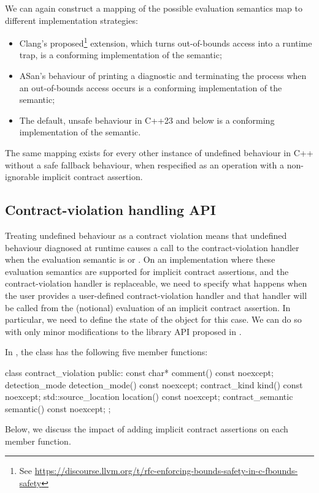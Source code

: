 We can again construct a mapping of the possible evaluation semantics map to different implementation strategies:
\begin{itemize}
\item Clang's proposed\footnote{See \url{https://discourse.llvm.org/t/rfc-enforcing-bounds-safety-in-c-fbounds-safety}}  extension, which turns out-of-bounds access into a runtime trap, is a conforming implementation of the  semantic;
\item ASan's behaviour of printing a diagnostic and terminating the process when an  out-of-bounds access occurs is a conforming implementation of the  semantic;
\item The default, unsafe behaviour in C++23 and below is a conforming implementation of the  semantic.
\end{itemize}
The same mapping exists for every other instance of undefined behaviour in C++ without a safe fallback behaviour, when respecified as an operation with a non-ignorable implicit contract assertion.

\subsection{Contract-violation handling API}

Treating undefined behaviour as a contract violation means that undefined behaviour diagnosed at runtime causes a call to the contract-violation handler when the evaluation semantic is  or . On an implementation where these evaluation semantics are supported for implicit contract assertions, and the contract-violation handler is replaceable, we need to specify what happens when the user provides a user-defined  contract-violation handler and that handler will be called from the (notional) evaluation of an implicit contract assertion. In particular, we need to define the state of the  object for this case. We can do so with only minor modifications to the library API proposed in \cite{P2900R6}. 

In \cite{P2900R6}, the  class has the following five member functions:
\begin{codeblock}
class contract_violation {
public:
  const char* comment() const noexcept;
  detection_mode detection_mode() const noexcept;
  contract_kind kind() const noexcept;
  std::source_location location() const noexcept;
  contract_semantic semantic() const noexcept;
};
\end{codeblock}
Below, we discuss the impact of adding implicit contract assertions on each member function.

